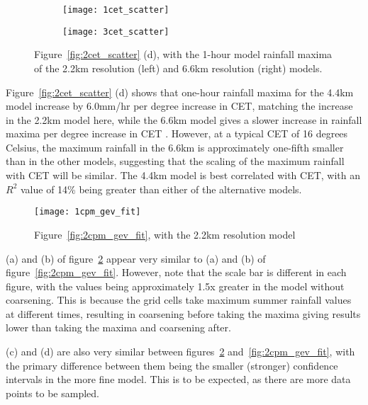 \begin{figure}[H]
    \centering
    \begin{subfigure}{0.48\textwidth}
        \centering
        \texttt{[image: 1cet\_scatter]}
    \end{subfigure}
    \hfill
    \begin{subfigure}{0.48\textwidth}
        \centering
        \texttt{[image: 3cet\_scatter]}
    \end{subfigure}
    \caption[Figure~\ref{fig:2cet_scatter} with 2.2km and 6.6km fits.]{
        Figure~\ref{fig:2cet_scatter} (d), with the 1-hour model rainfall maxima of the 2.2km resolution (left) and 6.6km resolution (right) models.}
    \label{fig:13cet_scatter}
\end{figure}

Figure~\ref{fig:2cet_scatter} (d) shows that
    one-hour rainfall maxima for the 4.4km model increase by 6.0mm/hr per degree increase in CET,
    matching the increase in the 2.2km model here,
    while the 6.6km model gives a slower increase in rainfall maxima per degree increase in CET .
However, at a typical CET of 16 degrees Celsius,
    the maximum rainfall in the 6.6km is approximately one-fifth smaller than in the other models,
    suggesting that the scaling of the maximum rainfall with CET will be similar.
The 4.4km model is best correlated with CET, with an $R^2$ value of 14\% being greater than either of the alternative models.

\begin{figure}[H]
    \centering
    \texttt{[image: 1cpm\_gev\_fit]}
    \caption{Figure~\ref{fig:2cpm_gev_fit}, with the 2.2km resolution model}
    \label{fig:1cpm_gev_fit}
\end{figure}

(a) and (b) of figure~\ref{fig:1cpm_gev_fit} appear very similar to
    (a) and (b) of figure~\ref{fig:2cpm_gev_fit}.
However, note that the scale bar is different in each figure,
    with the values being approximately 1.5x greater in the model without coarsening.
This is because the grid cells take maximum summer rainfall values at different times,
    resulting in coarsening before taking the maxima giving results lower than taking the maxima and coarsening after.

(c) and (d) are also very similar between figures~\ref{fig:1cpm_gev_fit} and~\ref{fig:2cpm_gev_fit},
    with the primary difference between them being the smaller (stronger) confidence intervals in the more fine model.
This is to be expected, as there are more data points to be sampled.

